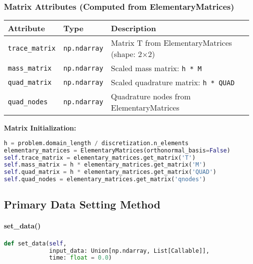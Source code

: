 \subsubsection{Matrix Attributes (Computed from ElementaryMatrices)}

\begin{longtable}{|p{3.5cm}|p{2.5cm}|p{7cm}|}
\hline
\textbf{Attribute} & \textbf{Type} & \textbf{Description} \\
\hline
\endhead

\texttt{trace\_matrix} & \texttt{np.ndarray} & Matrix T from ElementaryMatrices (shape: 2×2) \\
\hline

\texttt{mass\_matrix} & \texttt{np.ndarray} & Scaled mass matrix: \texttt{h * M} \\
\hline

\texttt{quad\_matrix} & \texttt{np.ndarray} & Scaled quadrature matrix: \texttt{h * QUAD} \\
\hline

\texttt{quad\_nodes} & \texttt{np.ndarray} & Quadrature nodes from ElementaryMatrices \\
\hline

\end{longtable}

\textbf{Matrix Initialization:}
\begin{lstlisting}[language=Python, caption=Matrix Initialization Code]
h = problem.domain_length / discretization.n_elements
elementary_matrices = ElementaryMatrices(orthonormal_basis=False)
self.trace_matrix = elementary_matrices.get_matrix('T')
self.mass_matrix = h * elementary_matrices.get_matrix('M')
self.quad_matrix = h * elementary_matrices.get_matrix('QUAD')
self.quad_nodes = elementary_matrices.get_matrix('qnodes')
\end{lstlisting}

\subsection{Primary Data Setting Method}
\label{subsec:set_data_method}

\paragraph{set\_data()}\leavevmode
\begin{lstlisting}[language=Python, caption=Set Data Method]
def set_data(self, 
             input_data: Union[np.ndarray, List[Callable]], 
             time: float = 0.0)
\end{lstlisting}

